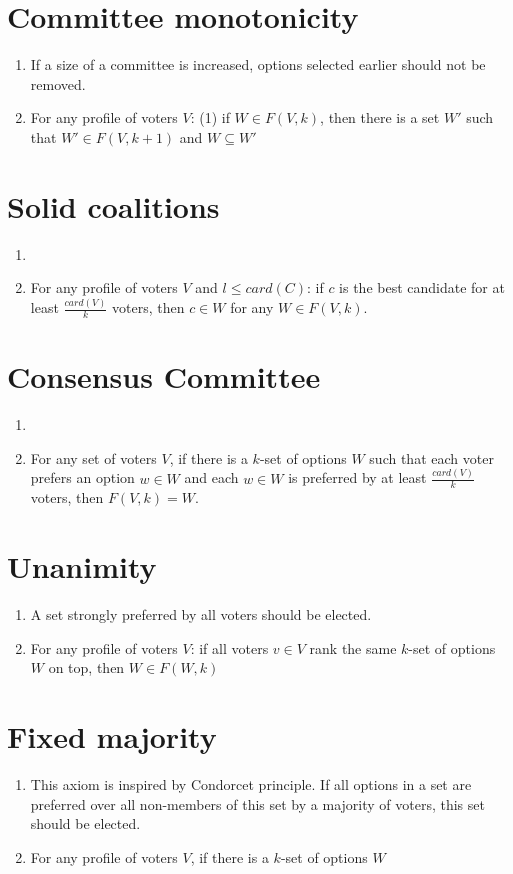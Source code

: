 \documentclass{article}
\begin{document}
\section{Committee monotonicity}
\begin{enumerate}
\item If a size of a committee is increased, options selected earlier should not be removed.
\item For any profile of voters $V$: (1) if $W \in F(V, k)$, then there is a set $W'$ such that $W' \in F(V, k+1)$ and $W \subseteq W'$ 
\end{enumerate}

\section{Solid coalitions}
\begin{enumerate}
\item 
\item For any profile of voters $V$ and $l \leq card(C)$: if $c$ is the best candidate for at least $\frac{card(V)}{k}$ voters, then $c \in W$ for any $W \in F(V, k)$.
\end{enumerate}

\section{Consensus Committee}
\begin{enumerate}
\item 
\item For any set of voters $V$, if there is a $k$-set of options $W$ such that each voter prefers an option $w \in W$ and each $w \in W$ is preferred by at least $\frac{card(V)}{k}$ voters, then $F(V, k) = W$. 
\end{enumerate}

\section{Unanimity}
\begin{enumerate}
\item A set strongly preferred by all voters should be elected.
\item For any profile of voters $V$: if all voters $v \in V$ rank the same $k$-set of options $W$ on top, then $W \in F(W, k)$
\end{enumerate}

\section{Fixed majority}
\begin{enumerate}
\item This axiom is inspired by Condorcet principle. If all options in a set are preferred over all non-members of this set by a majority of voters, this set should be elected.
\item For any profile of voters $V$, if there is a $k$-set of options $W$ 
\end{enumerate}
\end{document}
